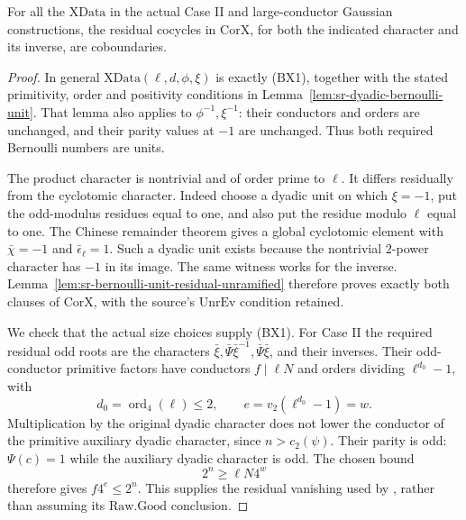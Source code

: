 \begin{srproposition}\label{prop:sr-actual-corx}
For all the \(\mathrm{XData}\) in the actual Case II
and large-conductor Gaussian constructions, the residual
cocycles in \(\mathrm{CorX}\), for both the indicated
character and its inverse, are coboundaries.
\end{srproposition}
\begin{proof}
In general \(\mathrm{XData}(\ell,d,\phi,\xi)\) is
exactly (BX1), together with the stated primitivity,
order and positivity conditions in
Lemma~\ref{lem:sr-dyadic-bernoulli-unit}.
That lemma also applies to \(\phi^{-1},\xi^{-1}\):
their conductors and orders are unchanged, and their
parity values at \(-1\) are unchanged.
Thus both required Bernoulli numbers are units.

The product character is nontrivial and of order
prime to \(\ell\).
It differs residually from the cyclotomic character.
Indeed choose a dyadic unit on which \(\xi=-1\),
put the odd-modulus residues equal to one, and also
put the residue modulo \(\ell\) equal to one.
The Chinese remainder theorem gives a global cyclotomic
element with \(\bar\chi=-1\) and
\(\bar\epsilon_\ell=1\).
Such a dyadic unit exists because the nontrivial
\(2\)-power character has \(-1\) in its image.
The same witness works for the inverse.
Lemma~\ref{lem:sr-bernoulli-unit-residual-unramified}
therefore proves exactly both clauses of
\(\mathrm{CorX}\), with the source's
\(\mathrm{UnrEv}\) condition retained.

We check that the actual size choices supply (BX1).
For Case II the required residual odd roots are
the characters
\(\bar\xi,\bar\Psi\bar\xi^{-1},
  \bar\Psi\bar\xi\), and their inverses.
Their odd-conductor primitive factors have conductors
\(f\mid\ell N\) and orders dividing
\(\ell^{d_0}-1\), with
\[
              d_0=\operatorname{ord}_4(\ell)\le2,\qquad
                       e=v_2(\ell^{d_0}-1)=w .
\]
Multiplication by the original dyadic character does
not lower the conductor of the primitive auxiliary
dyadic character, since \(n>c_2(\psi)\).
Their parity is odd: \(\Psi(c)=1\) while the
auxiliary dyadic character is odd.
The chosen bound
\[
                         2^n\ge\ell N4^w
\]
therefore gives \(f4^e\le2^n\).
This supplies the residual vanishing used by
, rather than
assuming its \(\mathrm{Raw.Good}\) conclusion.


\end{proof}
